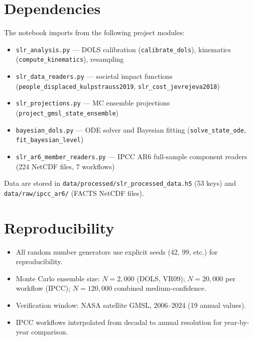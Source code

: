 \documentclass[11pt]{article}
\begin{document}
\section{Dependencies}

The notebook imports from the following project modules:
\begin{itemize}[noitemsep]
    \item \texttt{slr\_analysis.py} --- DOLS calibration (\texttt{calibrate\_dols}), kinematics (\texttt{compute\_kinematics}), resampling
    \item \texttt{slr\_data\_readers.py} --- societal impact functions (\texttt{people\_displaced\_kulpstrauss2019}, \texttt{slr\_cost\_jevrejeva2018})
    \item \texttt{slr\_projections.py} --- MC ensemble projections (\texttt{project\_gmsl\_state\_ensemble})
    \item \texttt{bayesian\_dols.py} --- ODE solver and Bayesian fitting (\texttt{solve\_state\_ode}, \texttt{fit\_bayesian\_level})
    \item \texttt{slr\_ar6\_member\_readers.py} --- IPCC AR6 full-sample component readers (224 NetCDF files, 7 workflows)
\end{itemize}

Data are stored in \texttt{data/processed/slr\_processed\_data.h5} (53 keys) and \texttt{data/raw/ipcc\_ar6/} (FACTS NetCDF files).

\section{Reproducibility}

\begin{itemize}[noitemsep]
    \item All random number generators use explicit seeds (42, 99, etc.) for reproducibility.
    \item Monte Carlo ensemble size: $N = 2{,}000$ (DOLS, VR09); $N = 20{,}000$ per workflow (IPCC); $N = 120{,}000$ combined medium-confidence.
    \item Verification window: NASA satellite GMSL, 2006--2024 (19 annual values).
    \item IPCC workflows interpolated from decadal to annual resolution for year-by-year comparison.
\end{itemize}
\end{document}
